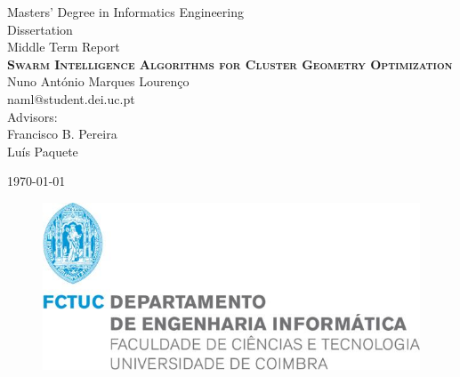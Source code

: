 \begin{titlepage}

\begin{flushleft}
\textsf{{\Large Masters' Degree in Informatics Engineering}} \\
\textsf{{\large Dissertation}} \\
\textsf{Middle Term Report} \\[5cm]

\textsc{{\Huge \textbf{Swarm Intelligence Algorithms for Cluster Geometry Optimization}}} \\[2cm]

{\large Nuno António Marques Lourenço} \\
naml@student.dei.uc.pt \\[1cm]

Advisors: \\
{\large Francisco B. Pereira} \\
{\large Luís Paquete} \\

\hfill

\today

\vfill

\begin{figure}[b!]
\includegraphics[width=0.6\linewidth]{pictures/fctuc}
\end{figure}

\end{flushleft}

\end{titlepage}